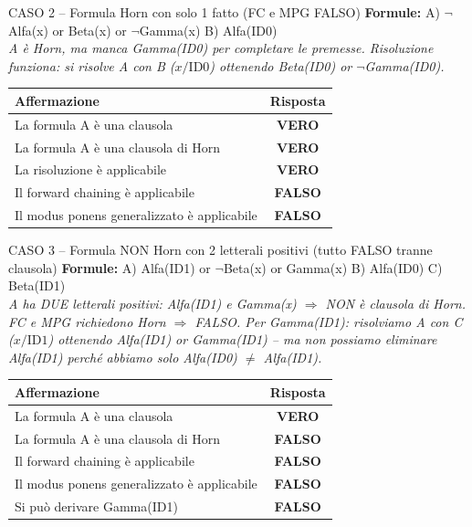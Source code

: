 \documentclass[12pt,a4paper]{article}
\newcommand{\V}{\textcolor{green!55!black}{\textbf{VERO}}}
\newcommand{\F}{\textcolor{red!65!black}{\textbf{FALSO}}}
\begin{document}
\begin{vftab}{CASO 2 -- Formula Horn con solo 1 fatto (FC e MPG FALSO)}
\textbf{Formule:} A) $\neg$Alfa(x) or Beta(x) or $\neg$Gamma(x) \quad B) Alfa(ID0)\\[4pt]
\textit{A è Horn, ma manca Gamma(ID0) per completare le premesse. Risoluzione funziona: si risolve A con B ($x/\text{ID0}$) ottenendo Beta(ID0) or $\neg$Gamma(ID0).}
\begin{center}
\renewcommand{\arraystretch}{1.3}
\begin{tabular}{lc}
\hline
\textbf{Affermazione} & \textbf{Risposta} \\
\hline
La formula A è una clausola & \V \\
La formula A è una clausola di Horn & \V \\
La risoluzione è applicabile & \V \\
Il forward chaining è applicabile & \F \\
Il modus ponens generalizzato è applicabile & \F \\
\hline
\end{tabular}
\end{center}
\end{vftab}

\vspace{6pt}

\begin{vftab}{CASO 3 -- Formula NON Horn con 2 letterali positivi (tutto FALSO tranne clausola)}
\textbf{Formule:} A) Alfa(ID1) or $\neg$Beta(x) or Gamma(x) \quad B) Alfa(ID0) \quad C) Beta(ID1)\\[4pt]
\textit{A ha DUE letterali positivi: Alfa(ID1) e Gamma(x) $\Rightarrow$ NON è clausola di Horn. FC e MPG richiedono Horn $\Rightarrow$ FALSO. Per Gamma(ID1): risolviamo A con C ($x/\text{ID1}$) ottenendo Alfa(ID1) or Gamma(ID1) -- ma non possiamo eliminare Alfa(ID1) perché abbiamo solo Alfa(ID0) $\neq$ Alfa(ID1).}
\begin{center}
\renewcommand{\arraystretch}{1.3}
\begin{tabular}{lc}
\hline
\textbf{Affermazione} & \textbf{Risposta} \\
\hline
La formula A è una clausola & \V \\
La formula A è una clausola di Horn & \F \\
Il forward chaining è applicabile & \F \\
Il modus ponens generalizzato è applicabile & \F \\
Si può derivare Gamma(ID1) & \F \\
\hline
\end{tabular}
\end{center}
\end{vftab}
\end{document}
